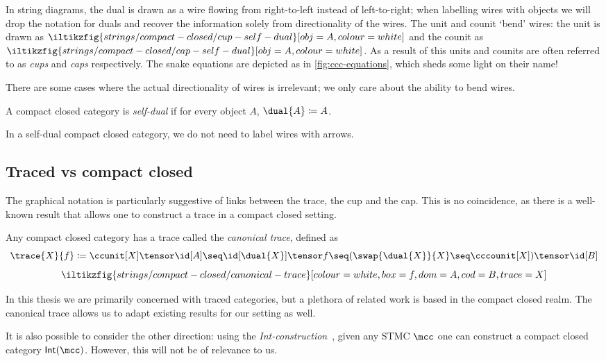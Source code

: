 In string diagrams, the dual is drawn as a wire flowing from right-to-left
instead of left-to-right; when labelling wires with objects we will drop the
notation for duals and recover the information solely from directionality of the
wires.
The unit and counit `bend' wires: the unit is drawn as \(
\iltikzfig{strings/compact-closed/cup-self-dual}[obj=A,colour=white]
\) and the counit as \(
\iltikzfig{strings/compact-closed/cap-self-dual}[obj=A,colour=white]
\).
As a result of this units and counits are often referred to as \emph{cups} and
\emph{caps} respectively.
The snake equations are depicted as in \cref{fig:ccc-equations}, which
sheds some light on their name!



There are some cases where the actual directionality of wires is irrelevant;
we only care about the ability to bend wires.

\begin{definition}
    A compact closed category is \emph{self-dual} if for every object \(A\),
    \(\dual{A} \coloneqq A\).
\end{definition}

In a self-dual compact closed category, we do not need to label wires with
arrows.

\subsection{Traced vs compact closed}

The graphical notation is particularly suggestive of links between the
trace, the cup and the cap.
This is no coincidence, as there is a well-known result that allows one to
construct a trace in a compact closed setting.

\begin{proposition}
    \label{prop:canonical-trace}
    Any compact closed category has a trace called the \emph{canonical trace},
    defined as \[
        \trace{X}{f}
        \coloneqq
        \ccunit[X] \tensor \id[A]
        \seq
        \id[\dual{X}] \tensor f
        \seq
        (\swap{\dual{X}}{X} \seq \cccounit[X]) \tensor \id[B]
    \]
    \[
        \iltikzfig{strings/compact-closed/canonical-trace}[colour=white,box=f,dom=A,cod=B,trace=X]
    \]
\end{proposition}

In this thesis we are primarily concerned with traced categories, but a plethora
of related work is based in the compact closed realm.
The canonical trace allows us to adapt existing results for our setting as well.

\begin{remark}
    It is also possible to consider the other direction: using the
    \emph{Int-construction}~\cite{joyal1996traced}, given any STMC
    \(\mcc\) one can construct a compact closed category \(\mathsf{Int}(\mcc)\).
    However, this will not be of relevance to us.
\end{remark}